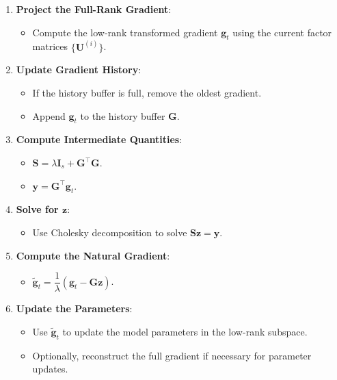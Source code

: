 \begin{enumerate}
    \item \textbf{Project the Full-Rank Gradient}:

    \begin{itemize}
        \item Compute the low-rank transformed gradient $\mathbf{g}_t$ using the current factor matrices $\{\mathbf{U}^{(i)}\}$.
    \end{itemize}

    \item \textbf{Update Gradient History}:

    \begin{itemize}
        \item If the history buffer is full, remove the oldest gradient.
        \item Append $\mathbf{g}_t$ to the history buffer $\mathbf{G}$.
    \end{itemize}

    \item \textbf{Compute Intermediate Quantities}:

    \begin{itemize}
        \item $\mathbf{S} = \lambda \mathbf{I}_s + \mathbf{G}^\top \mathbf{G}$.
        \item $\mathbf{y} = \mathbf{G}^\top \mathbf{g}_t$.
    \end{itemize}

    \item \textbf{Solve for $\mathbf{z}$}:

    \begin{itemize}
        \item Use Cholesky decomposition to solve $\mathbf{S} \mathbf{z} = \mathbf{y}$.
    \end{itemize}

    \item \textbf{Compute the Natural Gradient}:

    \begin{itemize}
        \item $\tilde{\mathbf{g}}_t = \dfrac{1}{\lambda} \left( \mathbf{g}_t - \mathbf{G} \mathbf{z} \right)$.
    \end{itemize}

    \item \textbf{Update the Parameters}:

    \begin{itemize}
        \item Use $\tilde{\mathbf{g}}_t$ to update the model parameters in the low-rank subspace.
        \item Optionally, reconstruct the full gradient if necessary for parameter updates.
    \end{itemize}
\end{enumerate}

